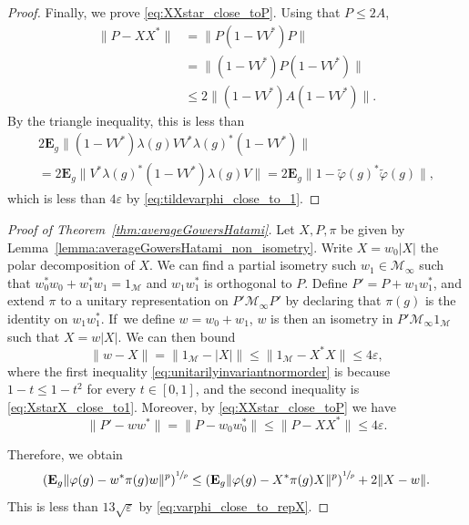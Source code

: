 \documentclass[10pt]{amsart}
\theoremstyle{plain}
\theoremstyle{definition}
\newcommand{\cM}{\mathcal{M}}
\newcommand{\E}{\mathbf{E}}
\begin{document}
\begin{proof}
Finally, we prove \eqref{eq:XXstar_close_toP}. Using that $P \leq 2A$,
\begin{align*} \|P - XX^*\| &= \|P(1-VV^*)P\| \\&= \|(1-VV^*)P(1-VV^*)\|\\ &\leq 2 \|(1-VV^*) A (1-VV^*)\|.
\end{align*}
By the triangle inequality, this is less than
\begin{multline*} 2 \E_g \|(1-VV^*) \lambda(g) VV^* \lambda(g)^* (1-VV^*)\|\\ = 2 \E_g \|V^* \lambda(g)^* (1-VV^*) \lambda(g) V\| = 2 \E_g \|1-\tilde{\varphi}(g)^* \tilde\varphi(g)\|,
\end{multline*}
which is less than $4\varepsilon$ by \eqref{eq:tildevarphi_close_to_1}.
\end{proof}
\begin{proof}[Proof of Theorem~\ref{thm:averageGowersHatami}]
Let $X,P,\pi$ be given by Lemma~\ref{lemma:averageGowersHatami_non_isometry}. Write $X = w_0 |X|$ the polar decomposition of $X$. We can find a partial isometry such $w_1 \in \cM_\infty$ such that $w_0^* w_0 +w_1 ^* w_1=1_\cM$ and $w_1 w_1^*$ is orthogonal to $P$. Define $P'=P+w_1 w_1^*$, and extend $\pi$ to a unitary representation on $P'\cM_\infty P'$ by declaring that $\pi(g)$ is the identity on $w_1 w_1^*$. If~we define $w=w_0+w_1$, $w$ is then an isometry in $P' \cM_\infty 1_\cM$ such that $X=w |X|$.
We can then bound\vspace*{-3pt}
\[
\| w-X\| = \|1_\cM - |X|\| \leq \|1_\cM - X^*X\| \leq 4\varepsilon,
\]
where the first inequality \eqref{eq:unitarilyinvariantnormorder} is because $1-t \leq 1-t^2$ for every $t\in[0,1]$, and the second inequality is \eqref{eq:XstarX_close_to1}. Moreover, by \eqref{eq:XXstar_close_toP} we have\vspace*{-3pt}
\[
\|P'-ww^*\| = \|P-w_0 w_0^*\| \leq \|P-X X^*\| \leq 4\varepsilon.
\]

Therefore, we obtain\vspace*{-3pt}
\[
\left(\E_g \|\varphi(g)-w^* \pi(g) w\|^p\right)^{\sfrac 1 p} \leq \left(\E_g \|\varphi(g)-X^* \pi(g) X\|^p\right)^{\sfrac 1 p} + 2 \|X-w\|.
\]
This is less than $13 \sqrt{\varepsilon}$ by \eqref{eq:varphi_close_to_repX}.
\end{proof}
\end{document}
